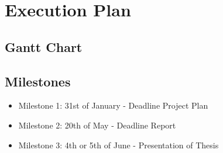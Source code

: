 \section{Execution Plan}
\subsection{Gantt Chart}
\begin{comment}
    1. Terraform for OpenStack
    2. Docker
    3. Evt. Database

    https://app.teamgantt.com/projects/gantt?ids=4177546
\end{comment}

\subsection{Milestones}
\begin{itemize}
    \item Milestone 1: 31st of January - Deadline Project Plan
    \item Milestone 2: 20th of May - Deadline Report
    \item Milestone 3: 4th or 5th of June - Presentation of Thesis
\end{itemize}

\begin{comment}
    kanskje ha en egen deadline/goal om MVP etter et par sprints
    kan gjøre user testing med en MVP
    ish midten av mars
\end{comment}